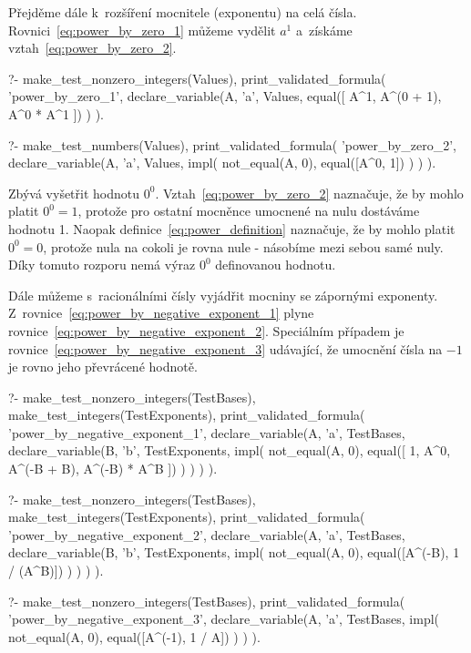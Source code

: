 Přejděme dále k~rozšíření mocnitele (exponentu) na celá čísla. Rovnici~\eqref{eq:power_by_zero_1} můžeme vydělit \(a^1\) a~získáme vztah~\eqref{eq:power_by_zero_2}.

\begin{prolog}
?-	make_test_nonzero_integers(Values),
	print_validated_formula(
		'power_by_zero_1',
		declare_variable(A, 'a', Values,
			equal([
				A^1,
				A^(0 + 1),
				A^0 * A^1
			])
		)
	).
\end{prolog}
\begin{prolog}
?-	make_test_numbers(Values),
	print_validated_formula(
		'power_by_zero_2',
		declare_variable(A, 'a', Values,
			impl(
				not_equal(A, 0),
				equal([A^0, 1])
			)
		)
	).
\end{prolog}

Zbývá vyšetřit hodnotu \(0^0\). Vztah~\eqref{eq:power_by_zero_2} naznačuje, že by mohlo platit \(0^0 = 1\), protože pro ostatní mocněnce umocnené na nulu dostáváme hodnotu 1. Naopak definice~\eqref{eq:power_definition} naznačuje, že by mohlo platit \(0^0 = 0\), protože nula na cokoli je rovna nule - násobíme mezi sebou samé nuly. Díky tomuto rozporu nemá výraz \(0^0\) definovanou hodnotu.

Dále můžeme s~racionálními čísly vyjádřit mocniny se zápornými exponenty. Z~rovnice~\eqref{eq:power_by_negative_exponent_1} plyne rovnice~\eqref{eq:power_by_negative_exponent_2}. Speciálním případem je rovnice~\eqref{eq:power_by_negative_exponent_3} udávající, že umocnění čísla na \(-1\) je rovno jeho převrácené hodnotě.

\begin{prolog}
?-	make_test_nonzero_integers(TestBases),
	make_test_integers(TestExponents),
	print_validated_formula(
		'power_by_negative_exponent_1',
		declare_variable(A, 'a', TestBases,
			declare_variable(B, 'b', TestExponents,
				impl(
					not_equal(A, 0),
					equal([
						1,
						A^0,
						A^(-B + B),
						A^(-B) * A^B
					])
				)
			)
		)
	).
\end{prolog}
\begin{prolog}
?-	make_test_nonzero_integers(TestBases),
	make_test_integers(TestExponents),
	print_validated_formula(
		'power_by_negative_exponent_2',
		declare_variable(A, 'a', TestBases,
			declare_variable(B, 'b', TestExponents,
				impl(
					not_equal(A, 0),
					equal([A^(-B), 1 / (A^B)])
				)
			)
		)
	).
\end{prolog}
\begin{prolog}
?-	make_test_nonzero_integers(TestBases),
	print_validated_formula(
		'power_by_negative_exponent_3',
		declare_variable(A, 'a', TestBases,
			impl(
				not_equal(A, 0),
				equal([A^(-1), 1 / A])
			)
		)
	).
\end{prolog}

